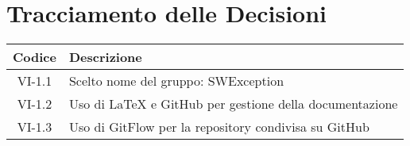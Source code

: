 \section*{Tracciamento delle Decisioni}

\begin{center}
	\begin{longtable}{|c|p{14.5cm}|}
	\hline
	\rowcolor{lighter-grayer}
	\textbf{Codice} & \textbf{Descrizione} \\
	\hline
	\endfirsthead

	\hline
	VI-1.1 & Scelto nome del gruppo: SWException \\
	VI-1.2 & Uso di LaTeX e GitHub per gestione della documentazione \\
	VI-1.3 & Uso di GitFlow per la repository condivisa su GitHub\\
	\hline

	\end{longtable}
\end{center}